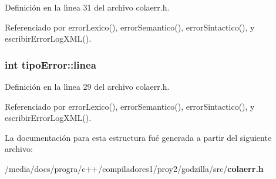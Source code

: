 Definici\'{o}n en la l\'{\i}nea 31 del archivo colaerr.h.

Referenciado por error\-Lexico(), error\-Semantico(), error\-Sintactico(), y escribir\-Error\-Log\-XML().
\subsubsection{\setlength{\rightskip}{0pt plus 5cm}int {\bf tipo\-Error::linea}}\label{structtipoError_o0}




Definici\'{o}n en la l\'{\i}nea 29 del archivo colaerr.h.

Referenciado por error\-Lexico(), error\-Semantico(), error\-Sintactico(), y escribir\-Error\-Log\-XML().

La documentaci\'{o}n para esta estructura fu\'{e} generada a partir del siguiente archivo:\begin{CompactItemize}
\item 
/media/docs/progra/c++/compiladores1/proy2/godzilla/src/{\bf colaerr.h}\end{CompactItemize}
